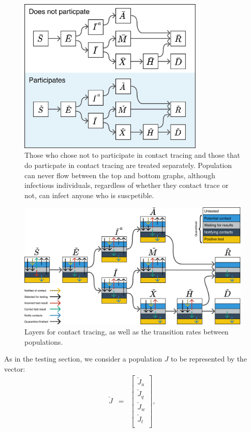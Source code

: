 \documentclass[notitlepage, superscriptaddress]{revtex4-2}
\begin{document}
\begin{figure}
\centering
\includegraphics[width=3.5in]{SEIR with contact tracing}
\caption{\label{f:SEIR-contactSeparation}
 Those who chose not to participate in contact tracing and those that do particpate in contact tracing are treated separately. Population can never flow between the top and bottom graphs, although infectious individuals, regardless of whether they contact trace or not, can infect anyone who is suscpetible.}
\end{figure}

\begin{figure}
\centering
\includegraphics[width=6.5in]{seir-c_5layer}
\caption{\label{f:SEIR-contact}
 Layers for contact tracing, as well as the transition rates between populations.}
\end{figure}

As in the testing section, we consider a population $J$ to be represented by the vector:
\begin{eqnarray}
\check{J} &=& 
    \begin{bmatrix}
    \check{J}_{u} \\
    \check{J}_{q} \\
    \check{J}_{w} \\
    \check{J}_{t} \\
    \end{bmatrix},
\end{eqnarray}
\end{document}
